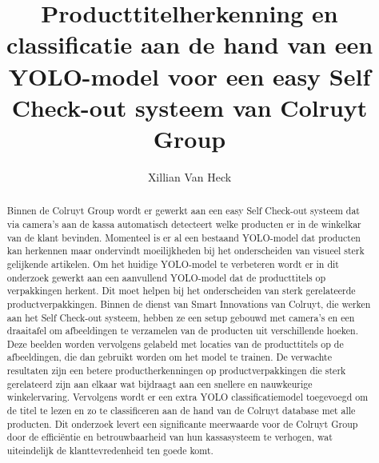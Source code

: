 \documentclass{hogent-article}
\title{Producttitelherkenning en classificatie aan de hand van een YOLO-model voor een easy Self Check-out systeem van Colruyt Group}
\author{Xillian Van Heck}
\begin{document}
\begin{abstract}
  Binnen de Colruyt Group wordt er gewerkt aan een easy Self Check-out systeem dat via camera’s aan de kassa automatisch detecteert welke producten er in de winkelkar van de klant bevinden.
  Momenteel is er al een bestaand YOLO-model dat producten kan herkennen maar ondervindt moeilijkheden bij het onderscheiden van visueel sterk gelijkende artikelen.
  Om het huidige YOLO-model te verbeteren wordt er in dit onderzoek gewerkt aan een aanvullend YOLO-model dat de producttitels op verpakkingen herkent.
  Dit moet helpen bij het onderscheiden van sterk gerelateerde productverpakkingen. Binnen de dienst van Smart Innovations van Colruyt, die werken aan het Self Check-out systeem, 
  hebben ze een setup gebouwd met camera’s en een draaitafel om afbeeldingen te verzamelen van de producten uit verschillende hoeken. 
  Deze beelden worden vervolgens gelabeld met locaties van de producttitels op de afbeeldingen, die dan gebruikt worden om het model te trainen. 
  De verwachte resultaten zijn een betere productherkenningen op productverpakkingen die sterk gerelateerd zijn aan elkaar wat bijdraagt aan een snellere en nauwkeurige winkelervaring.
  Vervolgens wordt er een extra YOLO classificatiemodel toegevoegd om de titel te lezen en zo te classificeren aan de hand van de Colruyt database met alle producten.
  Dit onderzoek levert een significante meerwaarde voor de Colruyt Group door de efficiëntie en betrouwbaarheid van hun kassasysteem te verhogen, wat uiteindelijk de klanttevredenheid ten goede komt.
\end{abstract}

\tableofcontents



\printbibliography[heading=bibintoc]
\end{document}
